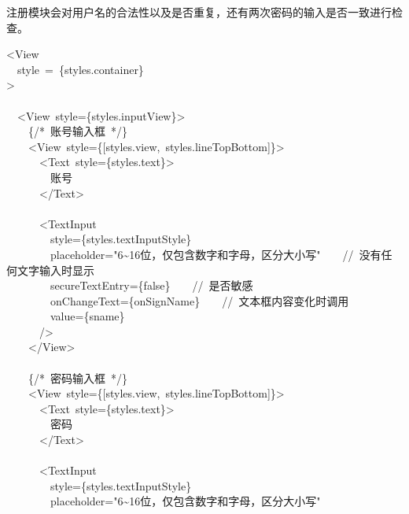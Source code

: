 \documentclass{article}
\begin{document}
注册模块会对用户名的合法性以及是否重复，还有两次密码的输入是否一致进行检查。
\begin{mdpre}%
\noindent\textless{}View\\
~~style~=~\{styles.container\}\\
\textgreater{}\\
\\
~~\textless{}View~style=\{styles.inputView\}\textgreater{}\\
~~~~\{{/*}{~账号输入框~}{*/}\}\\
~~~~\textless{}View~style=\{{}[styles.view,~styles.lineTopBottom]\}\textgreater{}\\
~~~~~~\textless{}Text~style=\{styles.text\}\textgreater{}\\
~~~~~~~~账号\\
~~~~~~\textless{}/Text\textgreater{}\\
\\
~~~~~~\textless{}TextInput\\
~~~~~~~~style=\{styles.textInputStyle\}\\
~~~~~~~~placeholder={"}{6\textasciitilde{}16位，仅包含数字和字母，区分大小写}{"}~~~~{//~没有任何文字输入时显示}\\
~~~~~~~~secureTextEntry=\{{false}\}~~~~{//~是否敏感}\\
~~~~~~~~onChangeText=\{onSignName\}~~~~{//~文本框内容变化时调用}\\
~~~~~~~~value=\{sname\}\\
~~~~~~/\textgreater{}\\
~~~~\textless{}/View\textgreater{}\\
\\
~~~~\{{/*}{~密码输入框~}{*/}\}\\
~~~~\textless{}View~style=\{{}[styles.view,~styles.lineTopBottom]\}\textgreater{}\\
~~~~~~\textless{}Text~style=\{styles.text\}\textgreater{}\\
~~~~~~~~密码\\
~~~~~~\textless{}/Text\textgreater{}\\
\\
~~~~~~\textless{}TextInput\\
~~~~~~~~style=\{styles.textInputStyle\}\\
~~~~~~~~placeholder={"}{6\textasciitilde{}16位，仅包含数字和字母，区分大小写}{"}\\

\end{mdpre}
\end{document}
